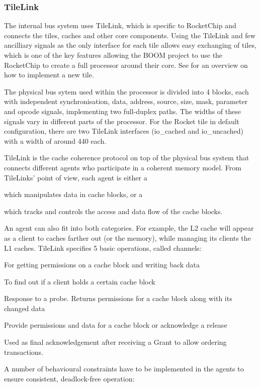 \documentclass[journal,a4paper]{IEEEtran}
\begin{document}
\subsubsection{TileLink}
The internal bus system uses TileLink\cite{tilelink}, which is specific to RocketChip and connects the tiles, caches and other core components.
Using the TileLink and few ancilliary signals as the only interface for each tile allows easy exchanging of tiles, which is one of the key features allowing the BOOM project to use the RocketChip to create a full processor around their core.
See \cite[p.23 ff]{rcgen-tutorial} for an overview on how to implement a new tile.

The physical bus sytem used within the processor is divided into 4 blocks, each with independent synchronisation, data, address, source, size, mask, parameter and opcode signals, implementing two full-duplex paths.
The widths of these signals vary in different parts of the processor. For the Rocket tile in default configuration, there are two TileLink interfaces (io\_cached and io\_uncached) with a width of around 440 each.

TileLink is the cache coherence protocol on top of the physical bus system that connects different agents who participate in a coherent memory model. From TileLinks' point of view, each agent is either a

\begin{description}
	\item[\texttt{Client}] which manipulates data in cache blocks, or a
	\item[\texttt{Manager}] which tracks and controls the access and data flow of the cache blocks.
\end{description}
An agent can also fit into both categories. For example, the L2 cache will appear as a client to caches farther out (or the memory), while managing its clients the L1 caches.
TileLink specifies 5 basic operations, called channels:
\begin{description}
		\label{tilelink-channels}
	\item[\texttt{Acquire}] For getting permissions on a cache block and writing back data
	\item[\texttt{Probe}] To find out if a client holds a certain cache block
	\item[\texttt{Release}] Response to a probe. Returns permissions for a cache block along with its changed data
	\item[\texttt{Grant}] Provide permissions and data for a cache block or acknowledge a release
	\item[\texttt{Finish}] Used as final acknowledgement after receiving a Grant to allow ordering transactions.
\end{description}
A number of behavioural constraints have to be implemented in the agents to ensure consistent, deadlock-free operation:
\end{document}

